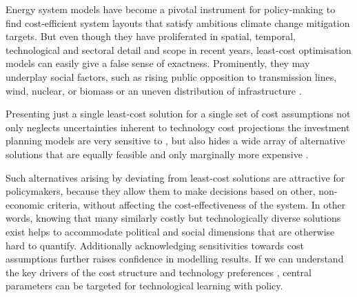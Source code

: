 
Energy system models have become a pivotal instrument for policy-making
to find cost-efficient system layouts that satisfy ambitious climate change mitigation targets.
But even though they have proliferated in spatial, temporal, technological and sectoral detail and scope in recent years,
least-cost optimisation models can easily give a false sense of exactness.
Prominently, they may underplay social factors, such as
rising public opposition to transmission lines, wind, nuclear, or biomass
or an uneven distribution of infrastructure \cite{mccollum_energy_2020,sasse_regional_2020}.

Presenting just a single least-cost solution for a single set of cost assumptions
not only neglects uncertainties inherent to technology cost projections the
investment planning models are very sensitive to
\cite{trondle_trade-offs_2020,Pfenninger2014,yue_review_2018,pye_assessing_2018,pye_modelling_2020},
but also hides a wide array of alternative solutions
that are equally feasible and only marginally more expensive
\cite{nearoptimal,lombardi_policy_2020,sasse_distributional_2019}.


Such alternatives arising by deviating from least-cost solutions are attractive for policymakers,
because they allow them to make decisions based on other, non-economic criteria,
without affecting the cost-effectiveness of the system.
In other words, knowing that many similarly costly but technologically diverse solutions
exist helps to accommodate political and social dimensions that are otherwise hard to quantify.
Additionally acknowledging sensitivities towards cost assumptions further raises confidence
in modelling results. If we can understand the key drivers of the cost structure and
technology preferences \cite{usher_value_2015,moret_characterization_2017},
central parameters can be targeted for technological learning with policy.



